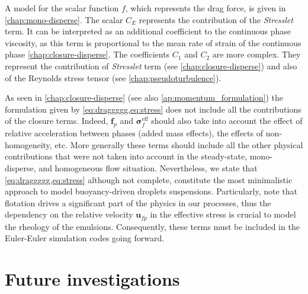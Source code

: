 A model for the scalar function $f$, which represents the drag force, is given in \ref{chap:mono-disperse}. 
The scalar $C_E$ represents the contribution of the \textit{Stresslet} term.
It can be interpreted as an additional coefficient to the continuous phase viscosity, as this term is proportional to the mean rate of strain of the continuous phase \eqref{chap:closure-disperse}.
The coefficients $C_1$ and $C_2$ are more complex. 
They represent the contribution of \textit{Stresslet} term (see \ref{chap:closure-disperse}) and also of the Reynolds stress tensor (see \ref{chap:pseudoturbulence}). 



As seen in \ref{chap:closure-disperse} (see also \ref{ap:momentum_formulation}) the formulation given by \ref{eq:draggggg,eq:stress} does not include all the contributions of the closure terms. 
Indeed, $\textbf{f}_p$ and $\bm\sigma_f^\text{eff}$ should also take into account the effect of relative acceleration between phases (added mass effects), the effects of non-homogeneity, etc.
More generally these terms should include all the other physical contributions that were not taken into account in the steady-state, mono-disperse, and homogeneous flow situation. 
Nevertheless, we state that \ref{eq:draggggg,eq:stress} although not complete, constitute the most minimalistic approach to model buoyancy-driven droplets suspensions. 
Particularly, note that flotation drives a significant part of the physics in our processes, thus the dependency on the relative velocity $\textbf{u}_{fp}$ in the effective stress is crucial to model the rheology of the emulsions.
Consequently, these terms must be included in the Euler-Euler simulation codes going forward.


\chapter*{Future investigations}


